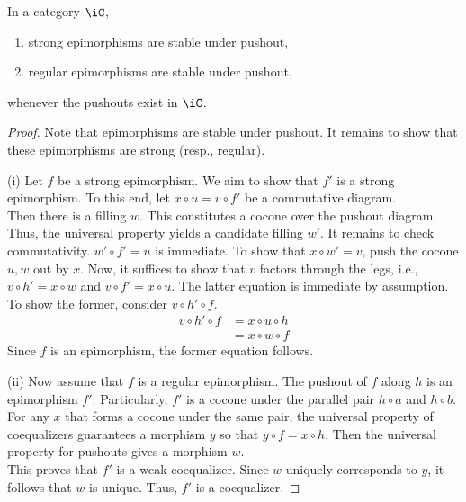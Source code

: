 \documentclass{amsart}
\begin{document}
\begin{prop}\label{prop:stability-pushout}
  In a category $\iC$,
  \begin{enumerate}
  \item strong epimorphisms are stable under pushout,
  \item regular epimorphisms are stable under pushout,
  \end{enumerate}
  whenever the pushouts exist in $\iC$.
\end{prop}
\begin{proof}
  Note that epimorphisms are stable under pushout.
  It remains to show that these epimorphisms are strong (resp., regular).

  (i) Let $f$ be a strong epimorphism.
  We aim to show that $f'$ is a strong epimorphism.
  To this end, let $x \circ u = v \circ f'$ be a commutative diagram.
  \[\]
  Then there is a filling $w$.
  This constitutes a cocone over the pushout diagram.
  Thus, the universal property yields a candidate filling $w'$.
  It remains to check commutativity.
  $w' \circ f' = u$ is immediate.
  To show that $x \circ w' = v$, push the cocone $u,w$ out by $x$.
  Now, it suffices to show that $v$ factors through the legs, i.e., $v \circ h' = x \circ w$ and $v \circ f' = x \circ u$.
  The latter equation is immediate by assumption.
  To show the former, consider $v \circ h' \circ f$.
  \begin{align}
    v \circ h' \circ f &= x \circ u \circ h\\
                       &= x \circ w \circ f
  \end{align}
  Since $f$ is an epimorphism, the former equation follows.

  (ii) Now assume that $f$ is a regular epimorphism.
  The pushout of $f$ along $h$ is an epimorphism $f'$.
  Particularly, $f'$ is a cocone under the parallel pair $h \circ a$ and $h \circ b$.
  For any $x$ that forms a cocone under the same pair, the universal property of coequalizers guarantees a morphism $y$ so that $y \circ f = x \circ h$.
  Then the universal property for pushouts gives a morphism $w$.
  \[\]
  This proves that $f'$ is a weak coequalizer.
  Since $w$ uniquely corresponds to $y$, it follows that $w$ is unique.
  Thus, $f'$ is a coequalizer.
\end{proof}
\end{document}
